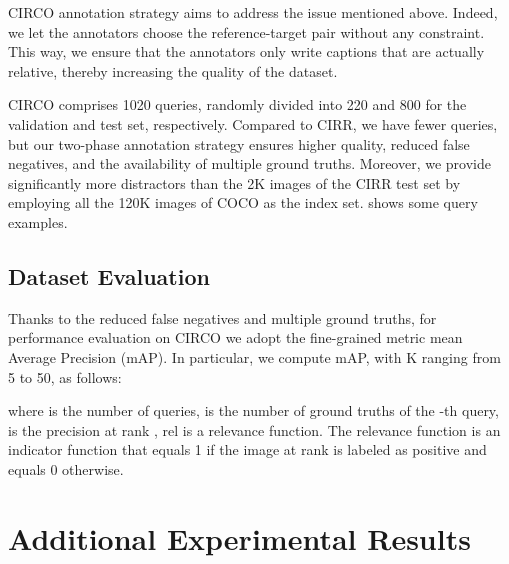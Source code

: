 \documentclass[10pt,twocolumn,letterpaper]{article}
\begin{document}
CIRCO annotation strategy aims to address the issue mentioned above. Indeed, we let the annotators choose the reference-target pair without any constraint. This way, we ensure that the annotators only write captions that are actually relative, thereby increasing the quality of the dataset.

CIRCO comprises 1020 queries, randomly divided into 220 and 800 for the validation and test set, respectively. Compared to CIRR, we have fewer queries, but our two-phase annotation strategy ensures higher quality, reduced false negatives, and the availability of multiple ground truths. Moreover, we provide significantly more distractors than the 2K images of the CIRR test set by employing all the 120K images of COCO as the index set.  shows some query examples.

\subsection{Dataset Evaluation}
Thanks to the reduced false negatives and multiple ground truths, for performance evaluation on CIRCO we adopt the fine-grained metric mean Average Precision (mAP). In particular, we compute mAP, with K ranging from 5 to 50, as follows:

where  is the number of queries,  is the number of ground truths of the -th query,  is the precision at rank , rel is a relevance function. The relevance function is an indicator function that equals 1 if the image at rank  is labeled as positive and equals 0 otherwise.



 \section{Additional Experimental Results}
\end{document}
